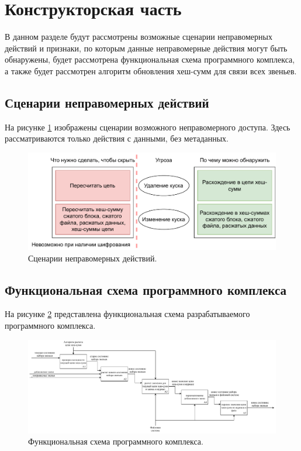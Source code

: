 \section{Конструкторская часть}

В данном разделе будут рассмотрены возможные сценарии неправомерных действий и признаки, по которым данные неправомерные действия могут быть обнаружены, будет рассмотрена функциональная схема программного комплекса, а также будет рассмотрен алгоритм обновления хеш-сумм для связи всех звеньев.

\subsection{Сценарии неправомерных действий}

На рисунке \ref{fig:scenarios} изображены сценарии возможного неправомерного доступа. Здесь рассматриваются только действия с данными, без метаданных.

\begin{figure}[hbtp]
	\centering
	\includegraphics[width=\textwidth]{img/scenarios.pdf}
	\caption{Сценарии неправомерных действий.}
	\label{fig:scenarios}
\end{figure}

\subsection{Функциональная схема программного комплекса}

На рисунке \ref{fig:idef} представлена функциональная схема разрабатываемого программного комплекса.

\pagebreak

\begin{figure}[hbtp]
	\centering
	\includegraphics[width=\textwidth]{img/idef.pdf}
	\caption{Функциональная схема программного комплекса.}
	\label{fig:idef}
\end{figure}

